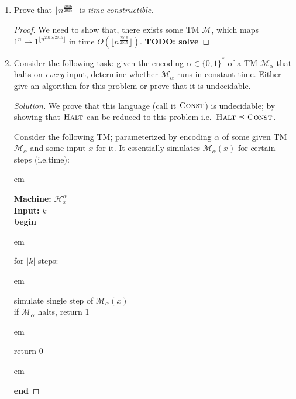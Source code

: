 \documentclass[usletter]{article}
\newcommand {\langset}[1]      {\ensuremath{\mathcal{#1}}}
\newcommand {\machine}[1]      {\ensuremath{\mathscr{#1}}}
\newcommand {\langfunc}        {\ensuremath{\mathfrak{L}}}
\newcommand {\namedlangset}[1] {\ensuremath{\textnormal{\textsc{#1}}}}
\newcommand {\family}[1]       {\ensuremath{\mathsf{#1}}}
\newcommand {\term}[1]      {\textit{#1}}
\newcommand {\reduce}[2]    {\ensuremath{\preceq_{#1}^{#2}}}
\newcommand {\indpar}[1]   {
  \par\leftskip=#1em
  \noindent\ignorespaces
}
\newenvironment{turing}[2] {
  \smallskip
  \indpar{2}
  \textbf{Machine:} #1\\
  \textbf{Input:} $#2$\\[5pt]
  \textbf{begin}
  \parskip=0pt
  \indpar{3}
}{
  \indpar{2}
  \textbf{end}
  \par\medskip
}
\newcommand{\ie}{\textnormal{i.e.}}
\newcommand{\todo}[1]{{\large \textbf{TODO: #1}}}
\newcommand {\langL}          {\langset{L}}
\newcommand {\machineM}       {\machine{M}}
\newcommand {\allstrings}     {\ensuremath{\{0,1\}^*}}
\begin{document}
\begin{enumerate}
\begin{proof}
    Thus, we have proved that
    $\langfunc(\machineM') =
     \langL_1 \cup (\langL_2 \cap \langL_3) \in \family{NP}$.
  \end{proof}

  \begin{remark}
    In fact, we can always treat unions as disjunctions and intersections as
    conjunctions over machine outputs;
    to prove that \family{NP} is closed under these operations.
  \end{remark}

  \item Prove that $\lfloor n^{\frac{2016}{2015}} \rfloor$
        is \term{time-constructible}.
  \begin{proof}
    We need to show that, there exists some TM \machineM,
    which maps $1^n \mapsto 1^{\lfloor n^{2016/2015} \rfloor}$
    in time $O(\lfloor n^{\frac{2016}{2015}} \rfloor)$.
    \todo{solve}
  \end{proof}

  \item Consider the following task: given the encoding $\alpha \in \allstrings$
        of a TM $\machineM_\alpha$ that halts on \textit{every} input,
        determine whether $\machineM_\alpha$ runs in constant time.
        Either give an algorithm for this problem
        or prove that it is undecidable.
  \begin{proof}[Solution]
    We prove that this language (call it \namedlangset{Const}) is undecidable;
    by showing that \namedlangset{Halt} can be reduced to this problem
    \ie\ $\namedlangset{Halt} \reduce{}{} \namedlangset{Const}$.

    Consider the following TM; parameterized by encoding $\alpha$ of some given
    TM $\machineM_\alpha$ and some input $x$ for it. It essentially simulates
    $\machineM_\alpha(x)$ for certain steps (\ie time):
    \begin{turing}{$\machine{H}^\alpha_x$}{k}
      for $|k|$ steps:
        \indpar{4}
        simulate single step of $\machineM_\alpha(x)$ \\
        if $\machineM_\alpha$ halts, return 1
      \indpar{3}
      return 0
    \end{turing}


\end{proof}
\end{enumerate}
\end{document}
